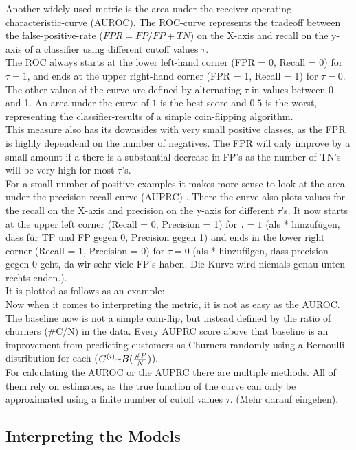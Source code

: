 \documentclass[12pt,titlepage]{article}
\begin{document}
Another widely used metric is the area under the receiver-operating-characteristic-curve (AUROC). The ROC-curve represents the tradeoff between the false-positive-rate ($FPR=FP/FP+TN$) on the X-axis and recall on the y-axis of a classifier using different cutoff values $\tau$. \\
The ROC always starts at the lower left-hand corner (FPR = 0, Recall = 0) for $\tau=1$, and ends at the upper right-hand corner (FPR = 1, Recall = 1) for $\tau=0$. The other values of the curve are defined by alternating $\tau$ in values between 0 and 1. An area under the curve of $1$ is the best score and $0.5$ is the worst, representing the classifier-results of a simple coin-flipping algorithm. \\
This measure also has its downsides with very small positive classes, as the FPR is highly dependend on the number of negatives. The FPR will only improve by a small amount if a there is a substantial decrease in FP's as the number of TN's will be very high for most $\tau$'s. \\
For a small number of positive examples it makes more sense to look at the area under the precision-recall-curve (AUPRC) \cite{auprc}. There the curve also plots values for the recall on the X-axis and precision on the y-axis for different $\tau$'s. It now starts at the upper left corner (Recall = 0, Precision = 1) for $\tau=1$ (als * hinzufügen, dass für TP und FP gegen 0, Precision gegen 1) and ends in the lower right corner (Recall = 1, Precision = 0) for $\tau=0$ (als * hinzufügen, dass precision gegen 0 geht, da wir sehr viele FP's haben. Die Kurve wird niemals genau unten rechts enden.). \\
It is plotted as follows as an example:\\
Now when it comes to interpreting the metric, it is not as easy as the AUROC. The baseline now is not a simple coin-flip, but instead defined by the ratio of churners (\#C/N) in the data. Every AUPRC score above that baseline is an improvement from predicting customers as Churners randomly using a Bernoulli-distribution for each ($C^{(i)}{\raise.17ex\hbox{$\scriptstyle\mathtt{\sim}$}} B(\frac{\#P}{N})$). \\
For calculating the AUROC or the AUPRC there are multiple methods. All of them rely on estimates, as the true function of the curve can only be approximated using a finite number of cutoff values $\tau$. (Mehr darauf eingehen). \\


\subsection{Interpreting the Models} \par
\end{document}
